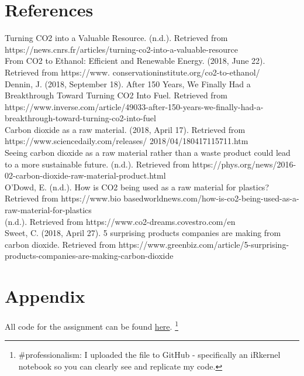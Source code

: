 \documentclass{article}
\begin{document}
\section*{References}
Turning CO2 into a Valuable Resource. (n.d.). Retrieved from https://news.cnrs.fr/articles/turning-co2-into-a-valuable-resource\\

From CO2 to Ethanol: Efficient and Renewable Energy. (2018, June 22). Retrieved from https://www. conservationinstitute.org/co2-to-ethanol/\\

Dennin, J. (2018, September 18). After 150 Years, We Finally Had a Breakthrough Toward Turning CO2 Into Fuel. Retrieved from https://www.inverse.com/article/49033-after-150-years-we-finally-had-a-breakthrough-toward-turning-co2-into-fuel \\

Carbon dioxide as a raw material. (2018, April 17). Retrieved from https://www.sciencedaily.com/releases/ 2018/04/180417115711.htm\\

Seeing carbon dioxide as a raw material rather than a waste product could lead to a more sustainable future. (n.d.). Retrieved from https://phys.org/news/2016-02-carbon-dioxide-raw-material-product.html\\

O'Dowd, E. (n.d.). How is CO2 being used as a raw material for plastics? Retrieved from https://www.bio basedworldnews.com/how-is-co2-being-used-as-a-raw-material-for-plastics\\

(n.d.). Retrieved from https://www.co2-dreams.covestro.com/en\\

Sweet, C. (2018, April 27). 5 surprising products companies are making from carbon dioxide. Retrieved from https://www.greenbiz.com/article/5-surprising-products-companies-are-making-carbon-dioxide

\section*{Appendix}
All code for the assignment can be found \href{https://github.com/thetruejacob/B166/blob/master/Forecasting%20Assingment/HoltWinters%20and%20ARIMA.ipynb}{here}.
 \footnote{\#professionalism: I uploaded the file to GitHub - specifically an iRkernel notebook so you can clearly see and replicate my code.}
\end{document}
